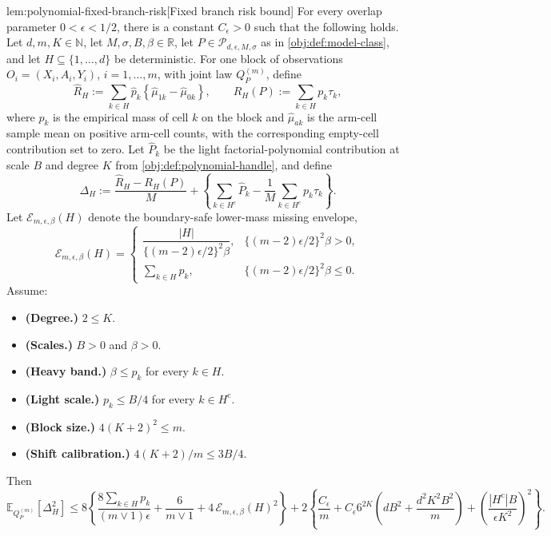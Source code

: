 \begin{lemmav}{lem:polynomial-fixed-branch-risk}[Fixed branch risk bound]
For every overlap parameter \(0<\epsilon<1/2\), there is a constant \(C_{\epsilon}>0\) such that the following holds.  Let \(d,m,K\in\mathbb N\), let \(M,\sigma,B,\beta\in\mathbb R\), let \(P\in\mathcal P_{d,\epsilon,M,\sigma}\) as in \cref{obj:def:model-class}, and let \(H\subseteq\{1,\ldots,d\}\) be deterministic.  For one block of observations \(O_i=(X_i,A_i,Y_i)\), \(i=1,\ldots,m\), with joint law \(Q_P^{(m)}\), define
\[
\widehat R_H
:=
\sum_{k\in H}
\widehat p_k
\left\{
\widehat\mu_{1k}-\widehat\mu_{0k}
\right\},
\qquad
R_H(P)
:=
\sum_{k\in H}p_k\tau_k,
\]
where \(\widehat p_k\) is the empirical mass of cell \(k\) on the block and \(\widehat\mu_{ak}\) is the arm-cell sample mean on positive arm-cell counts, with the corresponding empty-cell contribution set to zero.  Let \(\widehat P_k\) be the light factorial-polynomial contribution at scale \(B\) and degree \(K\) from \cref{obj:def:polynomial-handle}, and define
\[
\Delta_H
:=
\frac{\widehat R_H-R_H(P)}{M}
+
\left\{
\sum_{k\in H^{\mathrm c}}\widehat P_k
-\frac{1}{M}\sum_{k\in H^{\mathrm c}}p_k\tau_k
\right\}.
\]
Let \(\mathcal E_{m,\epsilon,\beta}(H)\) denote the boundary-safe lower-mass missing envelope,
\[
\mathcal E_{m,\epsilon,\beta}(H)
=
\begin{cases}
\dfrac{|H|}{\{(m-2)\epsilon/2\}^2\beta},
& \{(m-2)\epsilon/2\}^2\beta>0,\\[1.2ex]
\sum_{k\in H}p_k,
& \{(m-2)\epsilon/2\}^2\beta\le 0.
\end{cases}
\]
Assume:
\begin{itemize}
\item \textbf{(Degree.)} \(2\le K\).
\item \textbf{(Scales.)} \(B>0\) and \(\beta>0\).
\item \textbf{(Heavy band.)} \(\beta\le p_k\) for every \(k\in H\).
\item \textbf{(Light scale.)} \(p_k\le B/4\) for every \(k\in H^{\mathrm c}\).
\item \textbf{(Block size.)} \(4(K+2)^2\le m\).
\item \textbf{(Shift calibration.)} \(4(K+2)/m\le 3B/4\).
\end{itemize}
Then
\[
\mathbb E_{Q_P^{(m)}}\!\left[\Delta_H^2\right]
\le
8\left\{
\frac{8\sum_{k\in H}p_k}{(m\vee 1)\epsilon}
+\frac{6}{m\vee 1}
+4\,\mathcal E_{m,\epsilon,\beta}(H)^2
\right\}
+
2\left\{
\frac{C_{\epsilon}}{m}
+C_{\epsilon}6^{2K}
\left(dB^2+\frac{d^2K^2B^2}{m}\right)
+\left(\frac{|H^{\mathrm c}|B}{\epsilon K^2}\right)^2
\right\}.
\]
\end{lemmav}

